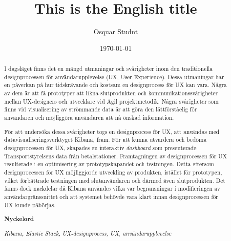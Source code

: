 \documentclass[12pt]{kththesis}
\title{This is the English title}
\author{Osquar Studnt}
\date{\today}
\begin{document}
\renewcommand\appendixname{Appendix}
\renewcommand\appendixpagename{Appendix}
\renewcommand\appendixtocname{Appendix}
\pagestyle{MyStyle}


\frontmatter
\afterpage{\null\newpage}


\afterpage{\null\newpage}

\begin{otherlanguage}{swedish}
  \begin{abstract}
\afterpage{\null\newpage}

I dagsläget finns det en mängd utmaningar och svårigheter inom den traditionella designprocessen för användarupplevelse (UX, User Experience). Dessa utmaningar har en påverkan på hur tidskrävande och kostsam en designprocess för UX kan vara. Några av dem är att få prototyper att likna slutprodukten och kommunikationssvårigheter mellan UX-designers och utvecklare vid Agil projektmetodik. Några svårigheter som finns vid visualisering av strömmande data är att göra den lättförståelig för användaren och möjliggöra användaren att nå önskad information.

För att undersöka dessa svårigheter togs en designprocess för UX, att användas med datavisualiseringsverktyget Kibana, fram. För att kunna utvärdera och bedöma designprocessen för UX, skapades en interaktiv \textit{dashboard} som presenterade Transportstyrelsens data från betalstationer. Framtagningen av designprocessen för UX resulterade i en optimisering av prototypskapandet och testningen. Detta eftersom designprocessen för UX möjliggjorde utveckling av produkten, istället för prototypen, vilket förbättrade testningen med slutanvändaren och därmed även slutprodukten. Det fanns dock nackdelar då Kibana användes vilka var begränsningar i modifieringen av användargränssnittet och att systemet behövde vara klart innan designprocessen för UX kunde påbörjas. 


\textbf{Nyckelord}

\textit{Kibana, Elastic Stack, UX-designprocess, UX, användarupplevelse}

 \end{abstract}
\end{otherlanguage}
 
\afterpage{\null\newpage}
\end{document}
